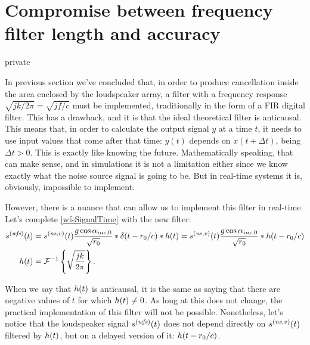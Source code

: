 \section{Compromise between frequency filter length and accuracy}

\begin{shownto}{private}
\end{shownto}

In previous section we've concluded that, in order to produce cancellation inside the area enclosed by the loudspeaker array, a filter with a frequency response $\sqrt{jk/2\pi} = \sqrt{jf/c}$ must be implemented, traditionally in the form of a FIR digital filter. This has a drawback, and it is that the ideal theoretical filter is anticausal. This means that, in order to calculate the output signal $y$ at a time $t$, it needs to use input values that come after that time: $y(t)$ depends on $x(t+\Delta t)$, being $\Delta t > 0$. This is exactly like knowing the future. Mathematically speaking, that can make sense, and in simulations it is not a limitation either since we know exactly what the noise source signal is going to be.
But in real-time systems it is, obviously, impossible to implement.

However, there is a nuance that can allow us to implement this filter in real-time. Let's complete \autoref{wfsSignalTime} with the new filter:
\begin{equation}
\begin{aligned}
\signal[wfs][time](t) &= \signal[nsVirt][time](t) \frac{g \cos\normPrimaryPropAngleSection}{\sqrt{\distLinePrimSource}}
\ast\delta(t - \distLinePrimSource/c)\ast \freqFilter(t) = \signal[nsVirt][time](t) \frac{g \cos\normPrimaryPropAngleSection}{\sqrt{\distLinePrimSource}}
\ast \freqFilter(t - \distLinePrimSource/c)\\
\freqFilter(t) &= \FourierTransform{\sqrt{\frac{jk}{2\pi}}}[inverse].
\end{aligned}
\label{rayleigh2_5Dsignal}
\end{equation}

When we say that $\freqFilter(t)$ is anticausal, it is the same as saying that there are negative values of $t$ for which $\freqFilter(t) \neq 0$. As long at this does not change, the practical implementation of this filter will not be possible. Nonetheless, let's notice that the loudspeaker signal $\signal[wfs][time](t)$ does not depend directly on $\signal[nsVirt][time](t)$ filtered by $\freqFilter(t)$, but on a delayed version of it: $\freqFilter(t - \distLinePrimSource/c)$.

